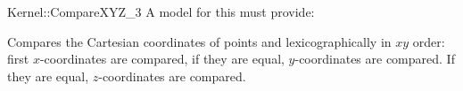 \begin{ccRefFunctionObjectConcept}{Kernel::CompareXYZ_3}
A model for this must provide:


      {Compares the Cartesian coordinates of points  and
        lexicographically in $xy$ order: first 
       $x$-coordinates are compared, if they are equal, $y$-coordinates
       are compared. If they are equal, $z$-coordinates are compared.}

\ccSeeAlso
{} \\

\end{ccRefFunctionObjectConcept}
